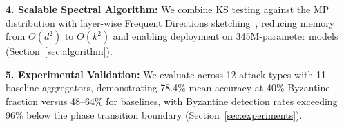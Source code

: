 \textbf{4. Scalable Spectral Algorithm:} We combine KS testing against the MP distribution
with layer-wise Frequent Directions sketching~\cite{frequent_directions,ghashami_fd},
reducing memory from $O(d^2)$ to $O(k^2)$ and enabling deployment on 345M-parameter models
(Section~\ref{sec:algorithm}).

\textbf{5. Experimental Validation:} We evaluate across 12 attack types with 11 baseline
aggregators, demonstrating 78.4\% mean accuracy at 40\% Byzantine fraction versus 48--64\%
for baselines, with Byzantine detection rates exceeding 96\% below the phase transition
boundary (Section~\ref{sec:experiments}).
